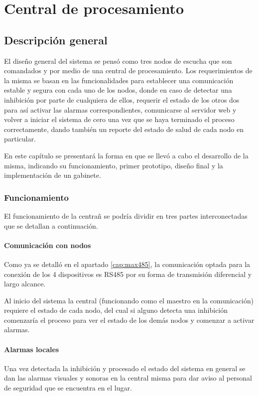 \chapter{Central de procesamiento}
\section{Descripción general}
\par El diseño general del sistema se pensó como tres nodos de escucha que son comandados y
por medio de una central de procesamiento. Los requerimientos de la misma se
basan en las funcionalidades para establecer una comunicación estable y segura con cada uno
de los nodos, donde en caso de detectar una inhibición por parte de cualquiera de ellos, requerir
el estado de los otros dos para así activar las alarmas correspondientes, comunicarse al
servidor web y volver a iniciar el sistema de cero una vez que se haya terminado el proceso
correctamente, dando también un reporte del estado de salud de cada nodo en particular.
\par En este capítulo se presentará la forma en que se llevó a cabo el desarrollo de la
misma, indicando su funcionamiento, primer prototipo, diseño final y la implementación de
un gabinete. 
\subsection{Funcionamiento}
\par El funcionamiento de la centrañ se podría dividir en tres partes interconectadas que se detallan a continuación.
\subsubsection{Comunicación con nodos}

\par Como ya se detalló en el apartado \ref{cap:max485}, la comunicación optada para la conexión de los 4 dispositivos es RS485 por su forma de transmisión diferencial y largo alcance. 
\par Al inicio del sistema la central (funcionando como el maestro en la comunicación) requiere el estado de cada nodo, del cual si alguno detecta una inhibición comenzaría el proceso para ver el estado de los demás nodos y comenzar a activar alarmas.

\subsubsection{Alarmas locales}
\par Una vez detectada la inhibición y procesado el estado del sistema en general se dan las alarmas visuales y sonoras en la central misma para dar aviso al personal de seguridad que se encuentra en el lugar. 

